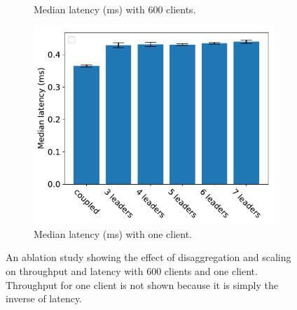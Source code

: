 \begin{figure}[ht]
\begin{subfigure}[b]{0.3\textwidth}
    \caption{Median latency (ms) with 600 clients.}%
  \end{subfigure}\hspace{0.03\textwidth}
  \begin{subfigure}[b]{0.3\textwidth}
    \centering
    \includegraphics[width=\textwidth]{assets/nsdi_fig2_ablation_low_load_latency.pdf}
    \caption{Median latency (ms) with one client.}%
  \end{subfigure}
  \caption{%
    An ablation study showing the effect of disaggregation and scaling on
    throughput and latency with 600 clients and one client. Throughput for one
    client is not shown because it is simply the inverse of latency.
  }
\end{figure}
